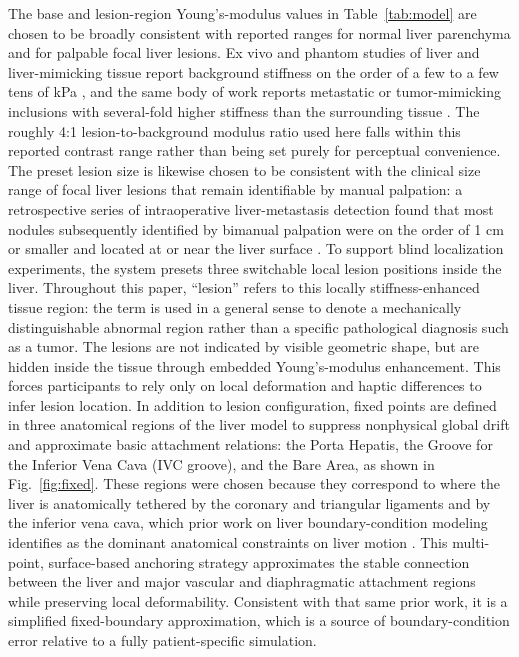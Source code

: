 \documentclass{ieeeaccess}
\begin{document}
The base and lesion-region Young's-modulus values in Table~\ref{tab:model} are chosen to be broadly consistent with reported ranges for normal liver parenchyma and for palpable focal liver lesions. Ex vivo and phantom studies of liver and liver-mimicking tissue report background stiffness on the order of a few to a few tens of kPa \cite{he2021abdominal,lee2025imagefree}, and the same body of work reports metastatic or tumor-mimicking inclusions with several-fold higher stiffness than the surrounding tissue \cite{he2021abdominal,lee2025imagefree}. The roughly 4:1 lesion-to-background modulus ratio used here falls within this reported contrast range rather than being set purely for perceptual convenience. The preset lesion size is likewise chosen to be consistent with the clinical size range of focal liver lesions that remain identifiable by manual palpation: a retrospective series of intraoperative liver-metastasis detection found that most nodules subsequently identified by bimanual palpation were on the order of 1 cm or smaller and located at or near the liver surface \cite{hata2011value}. To support blind localization experiments, the system presets three switchable local lesion positions inside the liver. Throughout this paper, ``lesion'' refers to this locally stiffness-enhanced tissue region: the term is used in a general sense to denote a mechanically distinguishable abnormal region rather than a specific pathological diagnosis such as a tumor. The lesions are not indicated by visible geometric shape, but are hidden inside the tissue through embedded Young's-modulus enhancement. This forces participants to rely only on local deformation and haptic differences to infer lesion location. In addition to lesion configuration, fixed points are defined in three anatomical regions of the liver model to suppress nonphysical global drift and approximate basic attachment relations: the Porta Hepatis, the Groove for the Inferior Vena Cava (IVC groove), and the Bare Area, as shown in Fig.~\ref{fig:fixed}. These regions were chosen because they correspond to where the liver is anatomically tethered by the coronary and triangular ligaments and by the inferior vena cava, which prior work on liver boundary-condition modeling identifies as the dominant anatomical constraints on liver motion \cite{nikolaev2020estimation}. This multi-point, surface-based anchoring strategy approximates the stable connection between the liver and major vascular and diaphragmatic attachment regions while preserving local deformability. Consistent with that same prior work, it is a simplified fixed-boundary approximation, which is a source of boundary-condition error relative to a fully patient-specific simulation.
\end{document}
